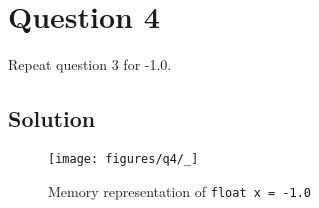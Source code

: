 \section*{Question 4}

Repeat question 3 for -1.0.

\subsection*{Solution}

\begin{figure*}[htb]
    \centering
    \texttt{[image: figures/q4/\_]}
    \caption{
        Memory representation of \texttt{float x = -1.0}
    }
\end{figure*}
